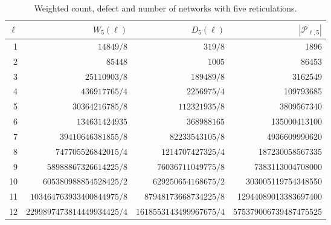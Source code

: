 \documentclass[11pt,a4paper]{article}
\theoremstyle{definition}
\newcommand{\cP}{\mathcal{P}}
\begin{document}
\begin{table}[ht]
\centering
\footnotesize
\begin{tabular}{rrrr}
\toprule
$\ell$ & $W_5(\ell)$ & $D_5(\ell)$ & $|\cP_{\ell,5}|$\\
\midrule
1 & $14849/8$ & $319/8$ & 1896\\
2 & $85448$ & $1005$ & 86453\\
3 & $25110903/8$ & $189489/8$ & 3162549\\
4 & $436917765/4$ & $2256975/4$ & 109793685\\
5 & $30364216785/8$ & $112321935/8$ & 3809567340\\
6 & $134631424935$ & $368988165$ & 135000413100\\
7 & $39410646381855/8$ & $82233543105/8$ & 4936609990620\\
8 & $747705526842015/4$ & $1214707427325/4$ & 187230058567335\\
9 & $58988867326614225/8$ & $76036711049775/8$ & 7383113004708000\\
10 & $605380988854528425/2$ & $629250654168675/2$ & 303005119754348550\\
11 & $103464763933400844975/8$ & $87948173668734225/8$ & 12944089013383697400\\
12 & $2299897473814449934425/4$ & $1618553143499967675/4$ & 575379006739487475525\\
\bottomrule
\end{tabular}
\caption{Weighted count, defect and number of networks with five reticulations.}
\label{tab:k5}
\end{table}
\end{document}
